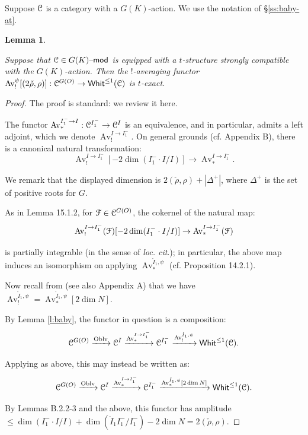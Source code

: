 \documentclass[reqno,11pt]{amsart}
\numberwithin{equation}{subsection}
\newtheorem{lem}[thm]{Lemma}
\theoremstyle{remark}
\newcommand{\xar}[1]{\xrightarrow{#1}}
\newcommand{\sC}{{\EuScript C}}
\newcommand{\sF}{{\EuScript F}}
\newcommand{\on}{\operatorname}
\newcommand{\mathendash}{\text{\textendash}}
\newcommand{\Whit}{\mathsf{Whit}}
\renewcommand{\mod}{\mathendash\mathsf{mod}}
\newcommand{\Oblv}{\on{Oblv}}
\newcommand{\Av}{\on{Av}}
\renewcommand{\o}[1]{\mathring{#1}}
\begin{document}
Suppose $\sC$ is a category with a $G(K)$-action. 
We use the notation of \S \ref{ss:baby-at}.

\begin{lem}\label{l:sph-av-exact}

Suppose that $\sC \in G(K)\mod$ is equipped with a 
$t$-structure strongly compatible with the $G(K)$-action. 
Then the $!$-averaging functor 
$\Av_!^{\psi}[(2\check{\rho},\rho)]:\sC^{G(O)} \to \Whit^{\leq 1}(\sC)$ is $t$-exact.

\end{lem}

\begin{proof}

The proof is standard: we review it here. 

The functor $\Av_*^{I_1^- \to I}:\sC^{I_1^-} \to \sC^I$ is an equivalence,
and in particular, admits a left adjoint, which we denote $\Av_!^{I \to I_1^-}$. 
On general grounds (cf. \cite{whit} Appendix B), 
there is a canonical natural transformation:
%
\[
\Av_!^{I \to I_1^-}[-2\dim (I_1^-\cdot I/I)] \to \Av_*^{I \to I_1^-}.
\]

\noindent We remark that the displayed dimension is $2(\check{\rho},\rho)+|\Delta^+|$,
where $\Delta^+$ is the set of positive roots for $G$. 

As in \cite{fg2} Lemma 15.1.2, for $\sF \in \sC^{G(O)}$, the cokernel
of the natural map:
%
\[
\Av_!^{I \to I_1^-}(\sF)[-2\dim (I_1^-\cdot I/I)] \to \Av_*^{I \to I_1^-}(\sF)
\]

\noindent is partially integrable (in the sense of \emph{loc. cit}.); 
in particular, the above map induces an isomorphism on applying
$\Av_*^{\o{I}_1,\psi}$ (cf. \cite{fg2} Proposition 14.2.1).

Now recall from \cite{bbm} (see also \cite{b-function} Appendix A) that we have 
$\Av_!^{\o{I}_1,\psi} = \Av_*^{\o{I}_1,\psi}[2\dim N]$.

By Lemma \ref{l:baby}, the functor in question is a composition:
%
\[
\sC^{G(O)} \xar{\Oblv} \sC^{I} \xar{\Av_*^{I \to I_1^-}} 
\sC^{I_1^-} \xar{\Av_!^{\o{I}_1,\psi}} \Whit^{\leq 1}(\sC).
\]

\noindent Applying \cite{bbm} as above, this may instead be written
as:
%
\[
\sC^{G(O)} \xar{\Oblv} \sC^{I} \xar{\Av_*^{I \to I_1^-}} 
\sC^{I_1^-} \xar{\Av_*^{\o{I}_1,\psi}[2\dim N]} \Whit^{\leq 1}(\sC).
\]

By \cite{whit} Lemmas B.2.2-3 and the above, this functor
has amplitude $\leq \dim (I_1^-\cdot I/I) + \dim (\o{I}_1 I_1^-/I_1^-) - 2\dim N = 
2(\check{\rho},\rho)$. 


\end{proof}
\end{document}

